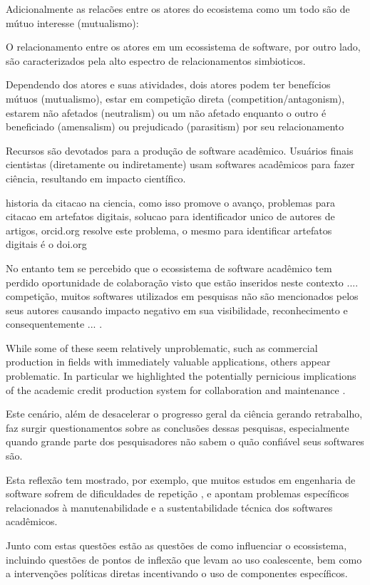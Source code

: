 Adicionalmente as relacões entre os atores do ecosistema como um todo
são de mútuo interesse (mutualismo):

O relacionamento entre os atores em um ecossistema de software, por outro lado,
são caracterizados pela alto espectro de relacionamentos simbioticos.

Dependendo dos atores e suas atividades, dois atores podem ter benefícios
mútuos (mutualismo), estar em competição direta (competition/antagonism),
estarem não afetados (neutralism) ou um não afetado enquanto o outro é
beneficiado (amensalism) ou prejudicado (parasitism) por seu relacionamento

Recursos são devotados para a produção de software acadêmico. Usuários finais
cientistas (diretamente ou indiretamente) usam softwares acadêmicos para fazer
ciência, resultando em impacto científico. 

historia da citacao na ciencia, como isso promove o avanço, problemas para
citacao em artefatos digitais, solucao para identificador unico de autores de
artigos, orcid.org resolve este problema, o mesmo para identificar artefatos
digitais é o doi.org

No entanto tem se percebido que o ecossistema de software acadêmico tem perdido
oportunidade de colaboração visto que estão inseridos neste contexto ....
competição, muitos softwares utilizados em pesquisas não são mencionados
pelos seus autores causando impacto negativo em sua visibilidade, reconhecimento e
consequentemente ...  \cite{howison2016software}.

While some of these seem relatively unproblematic, such as commercial
production in fields with immediately valuable applications, others appear
problematic. In particular we highlighted the potentially pernicious
implications of the academic credit production system for collaboration and
maintenance \cite{howison2011scientific}.

Este cenário, além de desacelerar o progresso geral da ciência gerando
retrabalho, faz surgir questionamentos sobre as conclusões dessas pesquisas,
especialmente quando grande parte dos pesquisadores não sabem o quão confiável
seus softwares são.

Esta
reflexão tem mostrado, por exemplo, que muitos estudos em engenharia de
software sofrem de dificuldades de repetição \cite{Tang2016}, e apontam
problemas específicos relacionados à manutenabilidade e a sustentabilidade
técnica dos softwares acadêmicos.

Junto com estas questões estão as questões de como influenciar o ecossistema,
incluindo questões de pontos de inflexão que levam ao uso coalescente, bem como
a intervenções políticas diretas incentivando o uso de componentes específicos.


